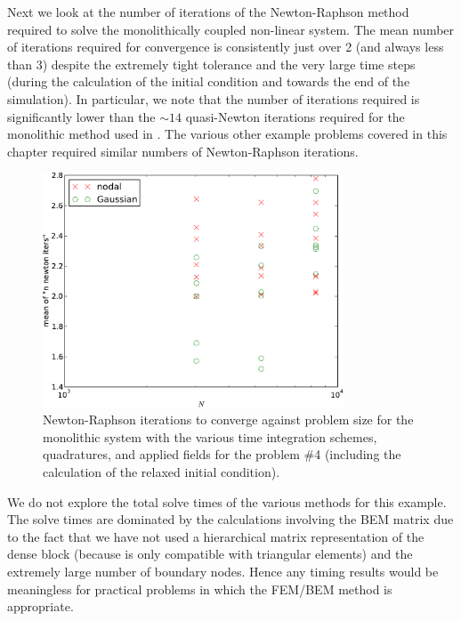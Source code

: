 Next we look at the number of iterations of the Newton-Raphson method required to solve the monolithically coupled non-linear system.
The mean number of iterations required for convergence is consistently just over 2 (and always less than 3) despite the extremely tight tolerance and the very large time steps (during the calculation of the initial condition and towards the end of the simulation).
In particular, we note that the number of iterations required is significantly lower than the $\sim 14$ quasi-Newton iterations required for the monolithic method used in \cite{DAquino2005}.
The various other example problems covered in this chapter required similar numbers of Newton-Raphson iterations.

\begin{figure}
  \centering
  \includegraphics[width=0.8\textwidth]
  {plots/mumag4_monolithic_its/meanofnnewtonitersvsinitialnnode.pdf}
  \caption{Newton-Raphson iterations to converge against problem size
    for the monolithic system with the various time integration schemes, quadratures, and applied fields for the \mumag problem \#4 (including the calculation of the relaxed initial condition).}
  \label{fig:mumag4-newton-iters}
\end{figure}


We do not explore the total solve times of the various methods for this example.
The solve times are dominated by the calculations involving the BEM matrix due to the fact that we have not used a hierarchical matrix representation of the dense block (because \hlib is only compatible with triangular elements) and the extremely large number of boundary nodes.
Hence any timing results would be meaningless for practical problems in which the FEM/BEM method is appropriate.


